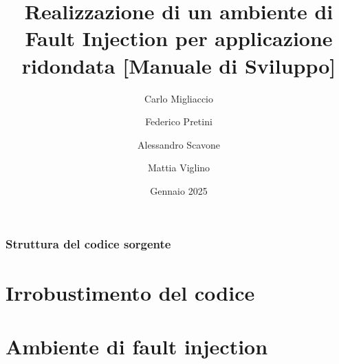 \documentclass{article}
\title{\textbf{ Realizzazione di un ambiente di Fault Injection
per applicazione ridondata [Manuale di Sviluppo]}}
\author{Carlo Migliaccio}
\author{Federico Pretini}
\author{Alessandro Scavone}
\author{Mattia Viglino}
\affil[1]{\small{Laurea Magistrale in Ingegneria Informatica, Politecnico di Torino}}
\date{Gennaio 2025}
\begin{document}
\renewcommand{\labelenumii}{\arabic{enumi}.\arabic{enumii}}

\maketitle
\vspace{-0.8cm}
\begin{abstract}
    \lipsum[1]
\end{abstract}
\tableofcontents

\section{Struttura del codice sorgente}

\part{Irrobustimento del codice}

\part{Ambiente di fault injection}

\newpage
\printbibliography
\end{document}
